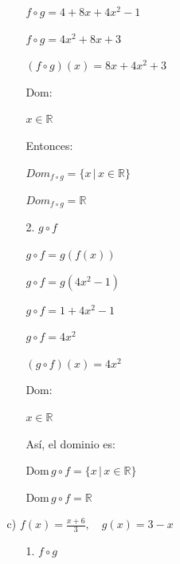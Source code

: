 \documentclass{article}
\begin{document}
\begin{enumerate}
\begin{enumerate}
\begin{enumerate}
                \( f \circ g = 4+8x+4x^2-1 \)
                
                \( f \circ g = 4x^2+8x+3 \)
                \vspace{\baselineskip}
                
                \( (f \circ g)(x) = 8x+4x^2+3 \)
                \vspace{\baselineskip}
                
                Dom:
                
                \(x \in \mathbb{R} \)
                \vspace{\baselineskip}
                
                Entonces:
                
                \(Dom_{f \circ g} = \{x \, | \, x \in \mathbb{R}\} \)
                
                \(Dom_{f \circ g} = \mathbb{R} \)
                
                \item[2.] \(g \circ f\)

                \( g \circ f = g(f(x)) \)
                
                \( g \circ f = g(4x^2 - 1) \)
                
                \( g \circ f = 1 + 4x^2 - 1 \)
                
                \( g \circ f = 4x^2 \)
                \vspace{\baselineskip}
                
                \( (g \circ f)(x) = 4x^2 \)
                \vspace{\baselineskip}
                
                Dom:
                
                \(x \in \mathbb{R} \)
                \vspace{\baselineskip}
                
                Así, el dominio es:
                
                \( \text{Dom} \, g \circ f = \{x \, | \, x \in \mathbb{R}\} \)
                
                \( \text{Dom} \, g \circ f = \mathbb{R} \)
            \end{enumerate}
            \vspace{\baselineskip}
            
        \item[c)] \(f(x) = \frac{x+6}{3}, \quad g(x) = 3-x\)
            \begin{enumerate}
                \item[1.] \(f \circ g\)


\end{enumerate}
\end{enumerate}
\end{enumerate}
\end{document}
